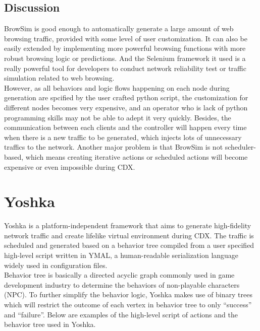 \documentclass[12pt]{report}
\begin{document}
\subsection{Discussion}

BrowSim is good enough to automatically generate a large amount of web browsing traffic, provided with some level of user customization. It can also be easily extended by implementing more powerful browsing functions with more robust browsing logic or predictions. And the Selenium framework it used is a really powerful tool for developers to conduct network reliability test or traffic simulation related to web browsing.\\

However, as all behaviors and logic flows happening on each node during generation are spcified by the user crafted python script, the customization for different nodes becomes very expensive, and an operator who is lack of python programming skills may not be able to adept it very quickly. Besides, the communication between each clients and the controller will happen every time when there is a new traffic to be generated, which injects lots of unnecessary traffics to the network. Another major problem is that BrowSim is not scheduler-based, which means creating iterative actions or scheduled actions will become expensive or even impossible during CDX.

\section{Yoshka}

Yoshka \citep{Yoshka} is a platform-independent framework that aims to generate high-fidelity network traffic and create lifelike virtual environment during CDX. The traffic is scheduled and generated based on a behavior tree compiled from a user specified high-level script written in YMAL, a human-readable serialization language widely used in configuration files.\\

Behavior tree \citep{BT1} \citep{BT2} is basically a directed acyclic graph commonly used in game development industry to determine the behaviors of non-playable characters (NPC). To further simplify the behavior logic, Yoshka makes use of binary trees which will restrict the outcome of each vertex in behavior tree to only “success” and “failure”. Below are examples of the high-level script of actions and the behavior tree used in Yoshka.\\
\end{document}
